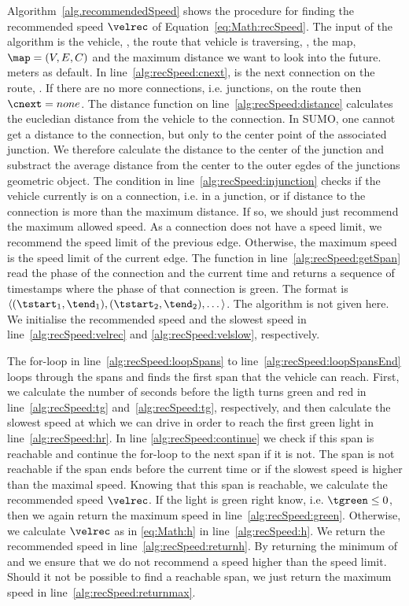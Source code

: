 Algorithm~\ref{alg.recommendedSpeed} shows the procedure for finding the recommended speed $\velrec$ of Equation~\ref{eq:Math:recSpeed}.
The input of the algorithm is the vehicle, \vel, the route that vehicle is traversing, \route, the map, $\map = (V, E, C)$ and the maximum distance we want to look into the future.  meters as default. %
In line~\ref{alg:recSpeed:cnext}, \cnext is the next connection on the route, \route. If there are no more connections, i.e. junctions, on the route then $\cnext=none$.
The distance function on line~\ref{alg:recSpeed:distance} calculates the eucledian distance from the vehicle to the connection.
In SUMO, one cannot get a distance to the connection, but only to the center point of the associated junction.
We therefore calculate the distance to the center of the junction and substract the average distance from the center to the outer egdes of the junctions geometric object. 
The condition in line~\ref{alg:recSpeed:injunction} checks if the vehicle currently is on a connection, i.e. in a junction, or if distance to the connection is more than the maximum distance. 
If so, we should just recommend the maximum allowed speed. 
As a connection does not have a speed limit, we recommend the speed limit of the previous edge.
Otherwise, the maximum speed is the speed limit of the current edge.
The function \getSpan{\cnext, \ti} in line~\ref{alg:recSpeed:getSpan} read the phase of the connection and the current time and returns a sequence of timestamps where the phase of that connection is green. The format is $\langle(\tstart_1, \tend_1), (\tstart_2, \tend_2), \dots\rangle$.
The algorithm is not given here.
We initialise the recommended speed and the slowest speed in line~\ref{alg:recSpeed:velrec} and \ref{alg:recSpeed:velslow}, respectively.

The for-loop in line~\ref{alg:recSpeed:loopSpans} to line~\ref{alg:recSpeed:loopSpansEnd} loops through the spans and finds the first span that the vehicle can reach.
First, we calculate the number of seconds before the ligth turns green and red in line~\ref{alg:recSpeed:tg} and~\ref{alg:recSpeed:tg}, respectively, and then calculate the slowest speed at which we can drive in order to reach the first green light in line~\ref{alg:recSpeed:hr}.
In line \ref{alg:recSpeed:continue} we check if this span is reachable and continue the for-loop to the next span if it is not. 
The span is not reachable if the span ends before the current time or if the slowest speed is higher than the maximal speed.
Knowing that this span is reachable, we calculate the recommended speed $\velrec$.
If the light is green right know, i.e. $\tgreen \leq 0$, then we again return the maximum speed in line~\ref{alg:recSpeed:green}. 
Otherwise, we calculate $\velrec$ as in \eqref{eq:Math:h} in line~\ref{alg:recSpeed:h}.
We return the recommended speed in line~\ref{alg:recSpeed:returnh}.
By returning the minimum of \velrec and \velmax we ensure that we do not recommend a speed higher than the speed limit.
Should it not be possible to find a reachable span, we just return the maximum speed in line~\ref{alg:recSpeed:returnmax}.

